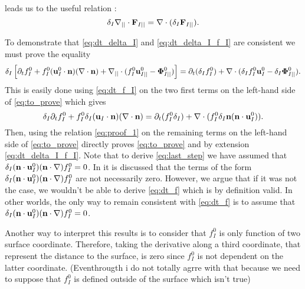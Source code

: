  leads us to the useful relation :
\begin{equation}
    \delta_I \mathbf{\nabla}_{||}\cdot \textbf{F}_{I||}
    = 
    \mathbf{\nabla}\cdot (\delta_I \textbf{F}_{I||}). 
    \label{eq:proof_1}
\end{equation}


To demonstrate that \ref{eq:dt_delta_I} and \ref{eq:dt_delta_I_f_I} are consistent we must prove the equality 
\begin{equation}
    \delta_I
    \left[ \partial_t f_I^0 
    + f_I^0 (\textbf{u}_{I}^0\cdot \textbf{n})  (\mathbf{\nabla}\cdot \textbf{n})
    +\mathbf{\nabla}_{||}\cdot
    (f_I^0 \textbf{u}_{I||}^0
    - \mathbf{\Phi}_{I||}^0 )
    \right]
    =
    \partial_t (\delta_If_I^0) 
    +\mathbf{\nabla}\cdot
    (\delta_If_I^0 \textbf{u}_I^0
        - \delta_I\mathbf{\Phi}_{I||}^0 ).
    \label{eq:to_prove}
\end{equation}
This is easily done  using \ref{eq:dt_f_I} on the two first terms on the left-hand side of \ref{eq:to_prove} which gives
\begin{equation}
    \delta_I \partial_t f_I^0 
    + f_I^0 \delta_I (\textbf{u}_I\cdot\textbf{n})(\mathbf{\nabla}\cdot \textbf{n})
    = 
     \partial_t (f_I^0 \delta_I)
    + \mathbf{\nabla}\cdot(f_I^0  \delta_I \textbf{n}(\textbf{n}\cdot\textbf{u}_I^0)). 
    \label{eq:last_step} 
\end{equation}
Then, using the relation \ref{eq:proof_1} on the remaining terms on the left-hand side of \ref{eq:to_prove} directly proves \ref{eq:to_prove} and by extension \ref{eq:dt_delta_I_f_I}. 
Note that to derive \ref{eq:last_step} we have assumed that $\delta_I (\textbf{n}\cdot\textbf{u}_I^0)(\textbf{n}\cdot\mathbf{\nabla}) f_I^0 = 0$. 
In \citet{orlando2023evolution} it is discussed that the terms of the form $\delta_I (\textbf{n}\cdot\textbf{u}_I^0)(\textbf{n}\cdot\mathbf{\nabla}) f_I^0 $ are not necessarily zero.  
However, we argue that if it was not the case, we wouldn't be able to derive \ref{eq:dt_f} which is by definition valid.
In other worlds, the only way to remain consistent with \ref{eq:dt_f} is to assume that $\delta_I (\textbf{n}\cdot\textbf{u}_I^0)(\textbf{n}\cdot\mathbf{\nabla}) f_I^0 = 0$.

Another way to interpret this results is to consider that $f_I^0$ is only function of two surface coordinate. 
Therefore, taking the derivative along a third coordinate, that represent the distance to the surface, is zero since $f_I^0$ is not dependent on the latter coordinate. 
(Eventhrougth i do not totally agrre with that because we need to suppose that $f_I^0$ is defined outside of the surface which isn't true)